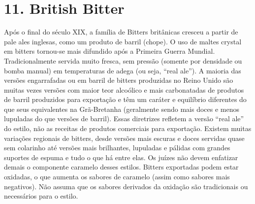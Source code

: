 \section*{11. British Bitter}

Após o final do século XIX, a família de Bitters britânicas cresceu a partir de pale ales inglesas, como um produto de barril (chope). O uso de maltes crystal em bitters tornou-se mais difundido após a Primeira Guerra Mundial. Tradicionalmente servida muito fresca, sem pressão (somente por densidade ou bomba manual) em temperaturas de adega (ou seja, “real ale”). A maioria das versões engarrafadas ou em barril de bitters produzidas no Reino Unido são muitas vezes versões com maior teor alcoólico e mais carbonatadas de produtos de barril produzidos para exportação e têm um caráter e equilíbrio diferentes do que seus equivalentes na Grã-Bretanha (geralmente sendo mais doces e menos lupuladas do que versões de barril). Essas diretrizes refletem a versão “real ale” do estilo, não as receitas de produtos comerciais para exportação. Existem muitas variações regionais de bitters, desde versões mais escuras e doces servidas quase sem colarinho até versões mais brilhantes, lupuladas e pálidas com grandes suportes de espuma e tudo o que há entre elas. Os juízes não devem enfatizar demais o componente caramelo desses estilos. Bitters exportadas podem estar oxidadas, o que aumenta os sabores de caramelo (assim como sabores mais negativos). Não assuma que os sabores derivados da oxidação são tradicionais ou necessários para o estilo.
